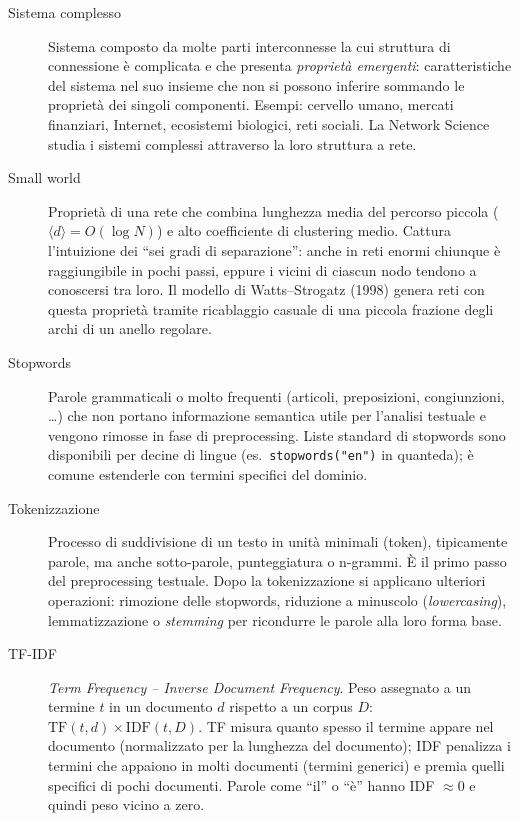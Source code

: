 \documentclass[12pt,a4paper]{article}
\begin{document}
\begin{description}
  \item[Sistema complesso] Sistema composto da molte parti interconnesse la cui struttura
  di connessione è complicata e che presenta \textit{proprietà emergenti}: caratteristiche
  del sistema nel suo insieme che non si possono inferire sommando le proprietà dei
  singoli componenti. Esempi: cervello umano, mercati finanziari, Internet, ecosistemi
  biologici, reti sociali. La Network Science studia i sistemi complessi attraverso la
  loro struttura a rete.

  \item[Small world] Proprietà di una rete che combina lunghezza media del percorso
  piccola ($\langle d \rangle = O(\log N)$) e alto coefficiente di clustering medio.
  Cattura l'intuizione dei ``sei gradi di separazione'': anche in reti enormi chiunque
  è raggiungibile in pochi passi, eppure i vicini di ciascun nodo tendono a conoscersi
  tra loro. Il modello di Watts–Strogatz (1998) genera reti con questa proprietà tramite
  ricablaggio casuale di una piccola frazione degli archi di un anello regolare.

  \item[Stopwords] Parole grammaticali o molto frequenti (articoli, preposizioni,
  congiunzioni, \ldots) che non portano informazione semantica utile per l'analisi
  testuale e vengono rimosse in fase di preprocessing. Liste standard di stopwords sono
  disponibili per decine di lingue (es.\ \texttt{stopwords("en")} in quanteda); è comune
  estenderle con termini specifici del dominio.

  \item[Tokenizzazione] Processo di suddivisione di un testo in unità minimali
  (token), tipicamente parole, ma anche sotto-parole, punteggiatura o n-grammi. È il
  primo passo del preprocessing testuale. Dopo la tokenizzazione si applicano ulteriori
  operazioni: rimozione delle stopwords, riduzione a minuscolo (\textit{lowercasing}),
  lemmatizzazione o \textit{stemming} per ricondurre le parole alla loro forma base.

  \item[TF-IDF] \textit{Term Frequency – Inverse Document Frequency}. Peso assegnato a
  un termine $t$ in un documento $d$ rispetto a un corpus $D$: $\text{TF}(t,d) \times
  \text{IDF}(t,D)$. TF misura quanto spesso il termine appare nel documento (normalizzato
  per la lunghezza del documento); IDF penalizza i termini che appaiono in molti documenti
  (termini generici) e premia quelli specifici di pochi documenti. Parole come ``il'' o
  ``è'' hanno IDF $\approx 0$ e quindi peso vicino a zero.


\end{description}
\end{document}
